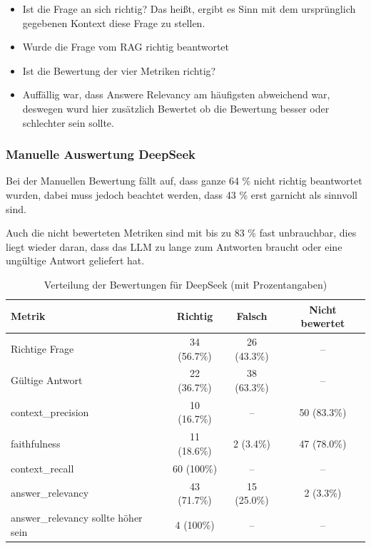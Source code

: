 \begin{itemize}
    \item Ist die Frage an sich richtig? Das heißt, ergibt es Sinn mit dem ursprünglich gegebenen Kontext diese Frage zu stellen.
    \item Wurde die Frage vom RAG richtig beantwortet
    \item Ist die Bewertung der vier Metriken richtig?
    \item Auffällig war, dass Answere Relevancy am häufigsten abweichend war, deswegen wurd hier zusätzlich Bewertet ob die Bewertung besser oder schlechter sein sollte.
\end{itemize}

\subsubsection{Manuelle Auswertung DeepSeek}
Bei der Manuellen Bewertung fällt auf, dass ganze 64 \% nicht richtig beantwortet wurden, dabei muss jedoch beachtet werden, dass 43 \% erst garnicht als sinnvoll sind.

Auch die nicht bewerteten Metriken sind mit bis zu 83 \% fast unbrauchbar, dies liegt wieder daran, dass das LLM zu lange zum Antworten braucht oder eine ungültige Antwort geliefert hat.
\begin{table}[h!]
    \centering
    \begin{tabular}{|l|c|c|c|}
    \hline
    \textbf{Metrik} & \textbf{Richtig} & \textbf{Falsch} & \textbf{Nicht bewertet} \\
    \hline
    Richtige Frage                        & 34 (56.7\%) & 26 (43.3\%) & -- \\
    Gültige Antwort                       & 22 (36.7\%) & 38 (63.3\%) & -- \\
    context\_precision                    & 10 (16.7\%) & --         & 50 (83.3\%) \\
    faithfulness                          & 11 (18.6\%) & 2 (3.4\%)  & 47 (78.0\%) \\
    context\_recall                       & 60 (100\%)  & --         & -- \\
    answer\_relevancy                     & 43 (71.7\%) & 15 (25.0\%) & 2 (3.3\%) \\
    answer\_relevancy sollte höher sein  & 4 (100\%)   & --         & -- \\
    \hline
    \end{tabular}
    \caption{Verteilung der Bewertungen für DeepSeek (mit Prozentangaben)}
\end{table}


